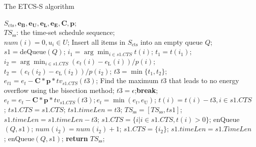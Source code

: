 \documentclass[journal,10pt]{IEEEtran}
\begin{document}
\begin{algorithm}[!htb]
\caption{The ETCS-S algorithm}
\begin{algorithmic}[1]\label{Alg_ETCS_S}
    \REQUIRE $S_\text{cts},\mathbf{e_B}, \mathbf{e_U}, \mathbf{e_L}, \mathbf{e_E}, \mathbf{C}, \mathbf{p}$;\\
    \ENSURE $TS_\text{ss}$: the time-set schedule sequence;\\
    \STATE $num(i)=0, u_i{\in}U$; Insert all items in $S_\text{cts}$ into an empty queue $Q$; \\
        \STATE $s1{=}$deQueue$(Q)$;
        \STATE $i_1{=}\arg \min_{i{\in}s1.CTS}t(i)$; $t_1{=}t(i_1)$; \label{line_timelen_time}
        \STATE $i_2{=}\arg \min_{i{\in}s1.CTS}(e_t(i){-}e_\text{L}(i))/p(i)$; $t_2{=}(e_t(i_2){-}e_\text{L}(i_2))/p(i_2)$; \label{line_timelen_emin}
            \STATE $t3{=}\min\{t_1,t_2\}$;
            \STATE $e_{t1}{=}e_t{-}\mathbf{C}{*}\mathbf{p}{*}tv_{s1.CTS}(t3)$;
                \STATE Find the maximum $t3$ that leads to no energy overflow using the bisection method;\label{line_timelen_emax}
                    \STATE $t3{=}\epsilon$;\textbf{break};\label{slicelen2epsilon}
                \ENDIF
            \ENDWHILE
            \STATE $e_{t}{=}e_t{-}\mathbf{C}{*}\mathbf{p}{*}tv_{s1.CTS}(t3); e_{t}{=}\min{(e_{t},e_\text{U})}$;
            \STATE $t(i){=}t(i){-}t3, i{\in}s1.CTS$;
            \STATE $ts1.CTS{=}s1.CTS$; $ts1.timeLen{=}t3$;
            \STATE $TS_\text{ss}{=}[TS_\text{ss},ts1]$;$s1.timeLen{=}s1.timeLen{-}t3$;
            \STATE $s1.CTS{=}\{i|i{\in}s1.CTS, t(i){>}0\}$;
                \STATE enQueue$(Q,s1)$;
            \ENDIF
        \ELSE
            \STATE $num(i_2){=}num(i_2){+}1$;
                \STATE $s1.CTS{=}\{i_2\}$; $s1.timeLen{=}s1.TimeLen$;
                \STATE enQueue$(Q,s1)$;
            \ENDIF
        \ENDIF
     \ENDWHILE
     \STATE \textbf{return} $TS_\text{ss}$;
\end{algorithmic}
\end{algorithm}
\end{document}
